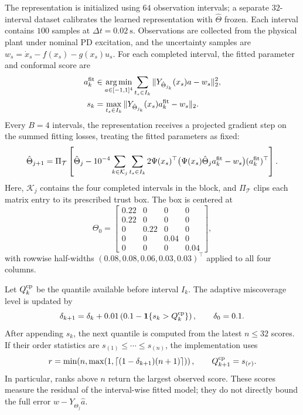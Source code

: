 \documentclass[11pt]{article}
\begin{document}
The representation is initialized using $64$ observation intervals;
a separate $32$-interval dataset calibrates the learned representation
with $\hat\Theta$ frozen. Each interval contains $100$ samples at
$\Delta t=0.02~\mathrm s$. Observations are collected from the physical
plant under nominal PD excitation, and the uncertainty samples are
$w_s=\dot x_s-f(x_s)-g(x_s)u_s$.
For each completed interval, the fitted parameter and conformal score are
\begin{equation}\label{eq:quad-score}
\begin{aligned}
    a_k^{\rm fit}&\in\underset{a\in[-1,1]^4}{\arg\min}
        \sum_{t_s\in I_k}\|Y_{\hat\Theta_{j_k}}(x_s)a-w_s\|_2^2,\\
    s_k&=\max_{t_s\in I_k}
        \|Y_{\hat\Theta_{j_k}}(x_s)a_k^{\rm fit}-w_s\|_2.
\end{aligned}
\end{equation}
Every $B=4$ intervals, the representation receives a projected gradient
step on the summed fitting losses, treating the fitted parameters as fixed:
\begin{equation}
    \hat\Theta_{j+1}=\Pi_{\mathcal T}\left[
      \hat\Theta_j-10^{-4}\sum_{k\in\mathcal K_j}\sum_{t_s\in I_k}
      2\Psi(x_s)^\top
      \big(\Psi(x_s)\hat\Theta_j a_k^{\rm fit}-w_s\big)
      (a_k^{\rm fit})^\top\right].
\end{equation}
Here, $\mathcal K_j$ contains the four completed intervals in the block,
and $\Pi_{\mathcal T}$ clips each matrix entry to its prescribed trust box.
The box is centered at
\begin{equation}
    \Theta_0=\begin{bmatrix}
      0.22&0&0&0\\0.22&0&0&0\\0&0.22&0&0\\
      0&0&0.04&0\\0&0&0&0.04
    \end{bmatrix},
\end{equation}
with rowwise half-widths $(0.08,0.08,0.06,0.03,0.03)^\top$
applied to all four columns.

Let $Q_k^{\rm cp}$ be the quantile available before interval $I_k$.
The adaptive miscoverage level is updated by
\begin{equation}
    \delta_{k+1}=\delta_k+0.01
       \left(0.1-\mathbf1\{s_k>Q_k^{\rm cp}\}\right),
       \qquad\delta_0=0.1.
\end{equation}
After appending $s_k$, the next quantile is computed from the latest
$n\le32$ scores. If their order statistics are
$s_{(1)}\le\cdots\le s_{(n)}$, the implementation uses
\begin{equation}
    r=\min\!\left(n,\max\!\left(1,
       \left\lceil(1-\delta_{k+1})(n+1)\right\rceil\right)\right),
       \qquad Q_{k+1}^{\rm cp}=s_{(r)}.
\end{equation}
In particular, ranks above $n$ return the largest observed score.
These scores measure the residual of the interval-wise fitted model;
they do not directly bound the full error $w-Y_{\hat\Theta_j}\hat a$.
\end{document}
